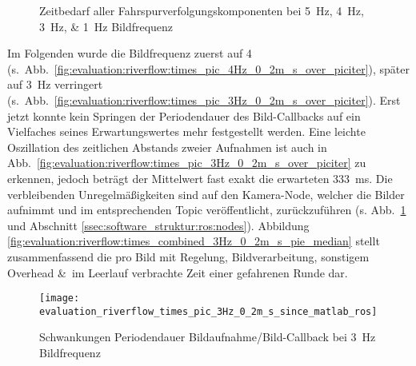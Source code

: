 \begin{figure}[htbp] %
\centering
{}
\hfill
{}
\hfill
{}
\hfill
{}
\caption{Zeitbedarf aller Fahrspurverfolgungskomponenten bei \SIlist{5;4;3;1}{\hertz} Bildfrequenz}
\end{figure}

Im Folgenden wurde die Bildfrequenz zuerst auf 4 (s.~Abb.~\ref{fig:evaluation:riverflow:times_pic_4Hz_0_2m_s_over_piciter}), später auf \SI{3}{\hertz} verringert (s.~Abb.~\ref{fig:evaluation:riverflow:times_pic_3Hz_0_2m_s_over_piciter}). Erst jetzt konnte kein Springen der Periodendauer des Bild-Callbacks auf ein Vielfaches seines Erwartungswertes mehr festgestellt werden. Eine leichte Oszillation des zeitlichen Abstands zweier Aufnahmen ist auch in Abb.~\ref{fig:evaluation:riverflow:times_pic_3Hz_0_2m_s_over_piciter} zu erkennen, jedoch beträgt der Mittelwert fast exakt die erwarteten \SI{333}{ms}. Die verbleibenden Unregelmäßigkeiten sind auf den Kamera-Node, welcher die Bilder aufnimmt und im entsprechenden Topic veröffentlicht, zurückzuführen (s. Abb.~\ref{fig:evaluation:riverflow:times_pic_3Hz_0_2m_s_since_matlab_ros} und Abschnitt \ref{ssec:software_struktur:ros:nodes}). Abbildung \ref{fig:evaluation:riverflow:times_combined_3Hz_0_2m_s_pie_median} 
stellt zusammenfassend die pro Bild mit Regelung, Bildverarbeitung, sonstigem Overhead \&\ im Leerlauf verbrachte Zeit einer gefahrenen Runde dar.

\begin{figure}[htbp]
\centering
\texttt{[image: evaluation\_riverflow\_times\_pic\_3Hz\_0\_2m\_s\_since\_matlab\_ros]}
\caption{Schwankungen Periodendauer Bildaufnahme/Bild-Callback bei \SI{3}{\hertz} Bildfrequenz}
\label{fig:evaluation:riverflow:times_pic_3Hz_0_2m_s_since_matlab_ros}
\end{figure}

